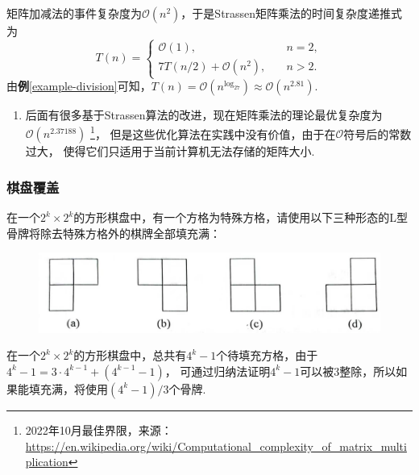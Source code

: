\documentclass[12pt, a4paper, oneside]{ctexart}
\numberwithin{equation}{section}  %
\theoremstyle{definition}
\newenvironment{remark}{\begin{enumerate}[label=\textbf{注\arabic*.}]}{\end{enumerate}}
\def\O{\mathcal{O}}         %
\begin{document}
矩阵加减法的事件复杂度为$\O(n^2)$，于是Strassen矩阵乘法的时间复杂度递推式为
\begin{equation*}
    T(n) = \begin{cases}
        \O(1),&\quad n=2,\\
        7T(n/2)+\O(n^2),&\quad n>2.
    \end{cases}
\end{equation*}
由\textbf{例}\ref{example-division}可知，$T(n) = \O(n^{\log_27})\approx \O(n^{2.81})$.
\begin{remark}
    \item 后面有很多基于Strassen算法的改进，现在矩阵乘法的理论最优复杂度为$\O(n^{2.37188})$
    \footnote{2022年10月最佳界限，来源：\url{https://en.wikipedia.org/wiki/Computational_complexity_of_matrix_multiplication}}，
    但是这些优化算法在实践中没有价值，由于在$\O$符号后的常数过大，
    使得它们只适用于当前计算机无法存储的矩阵大小.
\end{remark}
\subsubsection{棋盘覆盖}
在一个$2^k\times 2^k$的方形棋盘中，有一个方格为特殊方格，请使用以下三种形态的L型骨牌将除去特殊方格外的棋牌全部填充满：
\begin{figure}[htbp]
    \centering
    \includegraphics[scale=0.15]{four_L_dominos.jpg}
\end{figure}
在一个$2^k\times 2^k$的方形棋盘中，总共有$4^k-1$个待填充方格，由于$4^k-1 = 3\cdot 4^{k-1}+(4^{k-1}-1)$，
可通过归纳法证明$4^k-1$可以被$3$整除，所以如果能填充满，将使用$(4^k-1)/3$个骨牌.
\end{document}
